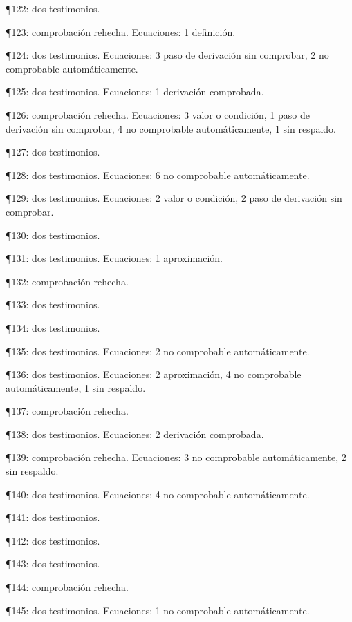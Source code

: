 \documentclass[10pt,openany]{book}
\begin{document}
\noindent ¶122: dos testimonios.\par
\noindent ¶123: comprobación rehecha. Ecuaciones: 1 definición.\par
\noindent ¶124: dos testimonios. Ecuaciones: 3 paso de derivación sin comprobar, 2 no comprobable automáticamente.\par
\noindent ¶125: dos testimonios. Ecuaciones: 1 derivación comprobada.\par
\noindent ¶126: comprobación rehecha. Ecuaciones: 3 valor o condición, 1 paso de derivación sin comprobar, 4 no comprobable automáticamente, 1 sin respaldo.\par
\noindent ¶127: dos testimonios.\par
\noindent ¶128: dos testimonios. Ecuaciones: 6 no comprobable automáticamente.\par
\noindent ¶129: dos testimonios. Ecuaciones: 2 valor o condición, 2 paso de derivación sin comprobar.\par
\noindent ¶130: dos testimonios.\par
\noindent ¶131: dos testimonios. Ecuaciones: 1 aproximación.\par
\noindent ¶132: comprobación rehecha.\par
\noindent ¶133: dos testimonios.\par
\noindent ¶134: dos testimonios.\par
\noindent ¶135: dos testimonios. Ecuaciones: 2 no comprobable automáticamente.\par
\noindent ¶136: dos testimonios. Ecuaciones: 2 aproximación, 4 no comprobable automáticamente, 1 sin respaldo.\par
\noindent ¶137: comprobación rehecha.\par
\noindent ¶138: dos testimonios. Ecuaciones: 2 derivación comprobada.\par
\noindent ¶139: comprobación rehecha. Ecuaciones: 3 no comprobable automáticamente, 2 sin respaldo.\par
\noindent ¶140: dos testimonios. Ecuaciones: 4 no comprobable automáticamente.\par
\noindent ¶141: dos testimonios.\par
\noindent ¶142: dos testimonios.\par
\noindent ¶143: dos testimonios.\par
\noindent ¶144: comprobación rehecha.\par
\noindent ¶145: dos testimonios. Ecuaciones: 1 no comprobable automáticamente.\par
\end{document}
